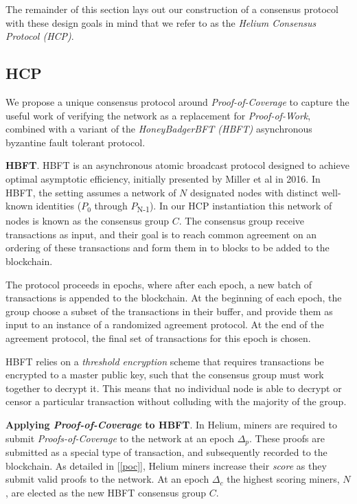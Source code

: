 \documentclass[10pt, nonatbib, nocopyrightspace, reprint]{sigplanconf}
\newcommand{\secref}[1]{[\autoref{#1}]}
\begin{document}
The remainder of this section lays out our construction of a consensus protocol with these design goals in mind that we refer to as the \emph{Helium Consensus Protocol (HCP)}.

\subsection{HCP}

We propose a unique consensus protocol around \emph{Proof-of-Coverage} to capture the useful work of verifying the network as a replacement for \emph{Proof-of-Work}, combined with a variant of the \emph{HoneyBadgerBFT (HBFT)} \cite{honeybadger} asynchronous byzantine fault tolerant protocol.

\textbf{HBFT}. HBFT is an asynchronous atomic broadcast protocol designed to achieve optimal asymptotic efficiency, initially presented by Miller et al in 2016. In HBFT, the setting assumes a network of $N$ designated nodes with distinct well-known identities ($P_0$ through $P$\textsubscript{N-1}). In our HCP instantiation this network of nodes is known as the consensus group $C$. The consensus group receive transactions as input, and their goal is to reach common agreement on an ordering of these transactions and form them in to blocks to be added to the blockchain.

The protocol proceeds in epochs, where after each epoch, a new batch of transactions is appended to the blockchain. At the beginning of each epoch, the group choose a subset of the transactions in their buffer, and provide them as input to an instance of a randomized agreement protocol. At the end of the agreement protocol, the final set of transactions for this epoch is chosen.

HBFT relies on a \emph{threshold encryption} scheme \cite{threshold-encryption} that requires transactions be encrypted to a master public key, such that the consensus group must work together to decrypt it. This means that no individual node is able to decrypt or censor a particular transaction without colluding with the majority of the group.

\textbf{Applying \emph{Proof-of-Coverage} to HBFT}. In Helium, miners are required to submit \emph{Proofs-of-Coverage} to the network at an epoch $\Delta_p$. These proofs are submitted as a special type of transaction, and subsequently recorded to the blockchain. As detailed in \secref{poc}, Helium miners increase their \emph{score} as they submit valid proofs to the network. At an epoch $\Delta_c$ the highest scoring miners, $N$, are elected as the new HBFT consensus group $C$.
\end{document}

